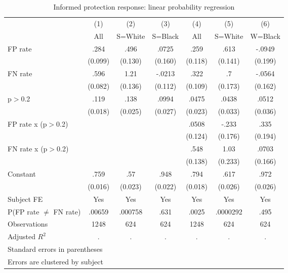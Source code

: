 \begin{table}[htbp]\centering
\caption{Informed protection response: linear probability regression}
\begin{tabular}{l*{6}{c}}
\hline\hline
                &\multicolumn{1}{c}{(1)}&\multicolumn{1}{c}{(2)}&\multicolumn{1}{c}{(3)}&\multicolumn{1}{c}{(4)}&\multicolumn{1}{c}{(5)}&\multicolumn{1}{c}{(6)}\\
                &\multicolumn{1}{c}{All}&\multicolumn{1}{c}{S=White}&\multicolumn{1}{c}{S=Black}&\multicolumn{1}{c}{All}&\multicolumn{1}{c}{S=White}&\multicolumn{1}{c}{W=Black}\\
\hline
FP rate         &     .284&     .496&    .0725&     .259&     .613&   -.0949\\
                &  (0.099)&  (0.130)&  (0.160)&  (0.118)&  (0.141)&  (0.199)\\
FN rate         &     .596&     1.21&   -.0213&     .322&       .7&   -.0564\\
                &  (0.082)&  (0.136)&  (0.112)&  (0.109)&  (0.173)&  (0.162)\\
p$>$0.2         &     .119&     .138&    .0994&    .0475&    .0438&    .0512\\
                &  (0.018)&  (0.025)&  (0.027)&  (0.023)&  (0.033)&  (0.036)\\
FP rate x (p$>$0.2)&         &         &         &    .0508&    -.233&     .335\\
                &         &         &         &  (0.124)&  (0.176)&  (0.194)\\
FN rate x (p$>$0.2)&         &         &         &     .548&     1.03&    .0703\\
                &         &         &         &  (0.138)&  (0.233)&  (0.166)\\
Constant        &     .759&      .57&     .948&     .794&     .617&     .972\\
                &  (0.016)&  (0.023)&  (0.022)&  (0.018)&  (0.026)&  (0.026)\\
Subject FE      &      Yes&      Yes&      Yes&      Yes&      Yes&      Yes\\
\hline
P(FP rate $\neq$ FN rate)&   .00659&  .000758&     .631&    .0025& .0000292&     .495\\
Observations    &     1248&      624&      624&     1248&      624&      624\\
Adjusted \(R^{2}\)&        .&        .&        .&        .&        .&        .\\
\hline\hline
\multicolumn{7}{l}{\footnotesize Standard errors in parentheses}\\
\multicolumn{7}{l}{\footnotesize Errors are clustered by subject}\\
\end{tabular}
\end{table}
